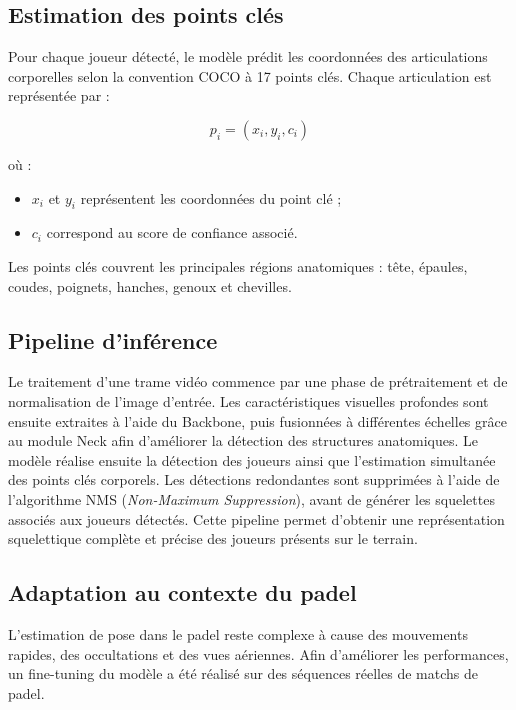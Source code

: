 \subsection{Estimation des points clés}

Pour chaque joueur détecté, le modèle prédit les coordonnées des articulations corporelles selon la convention COCO à 17 points clés. Chaque articulation est représentée par :

\begin{equation}
p_i = (x_i, y_i, c_i)
\end{equation}

où :
\begin{itemize}
    \item $x_i$ et $y_i$ représentent les coordonnées du point clé ;
    \item $c_i$ correspond au score de confiance associé.
\end{itemize}

Les points clés couvrent les principales régions anatomiques : tête, épaules, coudes, poignets, hanches, genoux et chevilles.

\subsection{Pipeline d’inférence}

Le traitement d’une trame vidéo commence par une phase de prétraitement et de normalisation de l’image d’entrée. Les caractéristiques visuelles profondes sont ensuite extraites à l’aide du Backbone, puis fusionnées à différentes échelles grâce au module Neck afin d’améliorer la détection des structures anatomiques. Le modèle réalise ensuite la détection des joueurs ainsi que l’estimation simultanée des points clés corporels. Les détections redondantes sont supprimées à l’aide de l’algorithme NMS (\textit{Non-Maximum Suppression}), avant de générer les squelettes associés aux joueurs détectés. Cette pipeline permet d’obtenir   une représentation squelettique complète et précise des joueurs présents sur le terrain.

\subsection{Adaptation au contexte du padel}

L’estimation de pose dans le padel reste complexe à cause des mouvements rapides, des occultations et des vues aériennes. Afin d’améliorer les performances, un fine-tuning du modèle a été réalisé sur des séquences réelles de matchs de padel.

